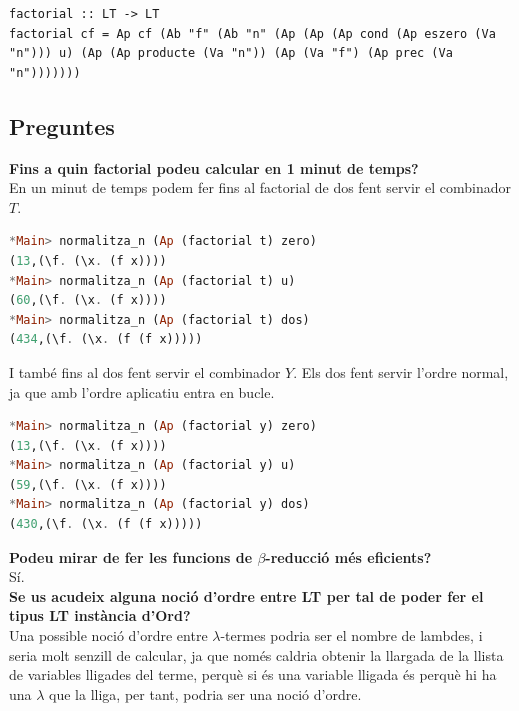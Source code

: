 \documentclass[10pt,a4paper]{article}
\begin{document}
\lstset{language=Haskell, breaklines=true, basicstyle=\footnotesize}
\begin{lstlisting}[frame=mystyle]
factorial :: LT -> LT
factorial cf = Ap cf (Ab "f" (Ab "n" (Ap (Ap (Ap cond (Ap eszero (Va "n"))) u) (Ap (Ap producte (Va "n")) (Ap (Va "f") (Ap prec (Va "n")))))))
\end{lstlisting}

\clearpage

\subsection{Preguntes}

\textbf{Fins a quin factorial podeu calcular en 1 minut de temps?} \\

En un minut de temps podem fer fins al factorial de dos fent servir el combinador $T$.

\begin{lstlisting}[language=Haskell]
*Main> normalitza_n (Ap (factorial t) zero)
(13,(\f. (\x. (f x))))
*Main> normalitza_n (Ap (factorial t) u)
(60,(\f. (\x. (f x))))
*Main> normalitza_n (Ap (factorial t) dos)
(434,(\f. (\x. (f (f x)))))
\end{lstlisting}

I també fins al dos fent servir el combinador $Y$. Els dos fent servir l'ordre normal, ja que amb l'ordre aplicatiu entra en bucle.

\begin{lstlisting}[language=Haskell]
*Main> normalitza_n (Ap (factorial y) zero)
(13,(\f. (\x. (f x))))
*Main> normalitza_n (Ap (factorial y) u)
(59,(\f. (\x. (f x))))
*Main> normalitza_n (Ap (factorial y) dos)
(430,(\f. (\x. (f (f x)))))
\end{lstlisting}

\textbf{Podeu mirar de fer les funcions de $\beta$-reducció més eficients?} \\

Sí. \\

\textbf{Se us acudeix alguna noció d’ordre entre LT per tal de poder fer el tipus LT instància d’Ord?} \\

Una possible noció d'ordre entre $\lambda$-termes podria ser el nombre de lambdes, i seria molt senzill de calcular, ja que només caldria obtenir la llargada de la llista de variables lligades del terme, perquè si és una variable lligada és perquè hi ha una $\lambda$ que la lliga, per tant, podria ser una noció d'ordre.
\end{document}
